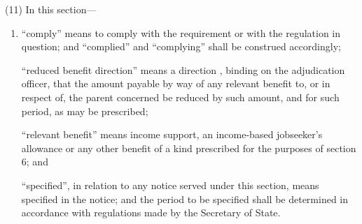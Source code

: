 \documentclass[12pt,a4paper]{article}
\begin{document}
(11) In this section—
\begin{enumerate}\item[]
    “comply” means to comply with the requirement or with the regulation in question; and “complied” and “complying” shall be construed accordingly;

    “reduced benefit direction” means a direction%
, binding on the adjudication officer,  %
that the amount payable by way of any relevant benefit to, or in respect of, the parent concerned be reduced by such amount, and for such period, as may be prescribed;

    “relevant benefit” means income support, 
an income-based jobseeker’s allowance  %
or any other benefit of a kind prescribed for the purposes of section 6; and

    “specified”, in relation to any notice served under this section, means specified in the notice; and the period to be specified shall be determined in accordance with regulations made by the Secretary of State. 
\end{enumerate}

\end{document}
